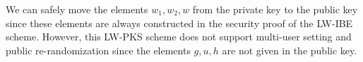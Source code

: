 \documentclass[11pt,letterpaper]{article}
\begin{document}
We can safely move the elements $w_1, w_2, w$ from the private key to the
public key since these elements are always constructed in the security proof
of the LW-IBE scheme. However, this LW-PKS scheme does not support multi-user
setting and public re-randomization since the elements $g, u, h$ are not
given in the public key.
\end{document}
